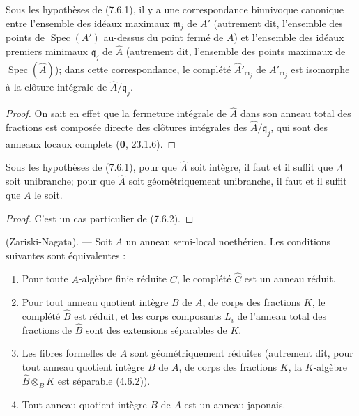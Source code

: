 \begin{corollary}[7.6.2]
\label{IV.2.s7.6.2-fr}
Sous les hypothèses de \textup{(7.6.1)}, il y a une correspondance biunivoque canonique
entre l'ensemble des idéaux maximaux $\mathfrak m_j$ de $A'$ \textup{(autrement dit,
l'ensemble des points de $\operatorname{Spec}(A')$ au-dessus du point fermé de
$A$)} et l'ensemble des idéaux premiers minimaux $\mathfrak q_j$ de
$\widehat A$ \textup{(autrement dit, l'ensemble des points maximaux de
$\operatorname{Spec}(\widehat A)$)}; dans cette correspondance, le complété
$\widehat{A}'_{\mathfrak m_j}$ de $A'_{\mathfrak m_j}$ est isomorphe à la
clôture intégrale de $\widehat A/\mathfrak q_j$.
\end{corollary}

\begin{proof}
On sait en effet que la fermeture intégrale de $\widehat A$ dans son anneau
total des fractions est composée directe des clôtures intégrales des
$\widehat A/\mathfrak q_j$, qui sont des anneaux locaux complets (\textbf{0}, 23.1.6).
\end{proof}

\begin{corollary}[7.6.3]
\label{IV.2.s7.6.3-fr}
Sous les hypothèses de \textup{(7.6.1)}, pour que $\widehat A$ soit intègre, il faut et
il suffit que $A$ soit unibranche; pour que $\widehat A$ soit géométriquement
unibranche, il faut et il suffit que $A$ le soit.
\end{corollary}

\begin{proof}
C'est un cas particulier de (7.6.2).
\end{proof}

\begin{theorem}[7.6.4]
(Zariski-Nagata). --- Soit $A$ un anneau semi-local noethérien. Les conditions
suivantes sont équivalentes :
\begin{enumerate}
\item[\emph{a)}] Pour toute $A$-algèbre finie réduite $C$, le complété
$\widehat C$ est un anneau réduit.
\item[\emph{a$'$)}] Pour tout anneau quotient intègre $B$ de $A$, de corps des
fractions $K$, le complété $\widehat B$ est réduit, et les corps composants
$L_i$ de l'anneau total des fractions de $\widehat B$ sont des extensions
séparables de $K$.
\item[\emph{a$''$)}] Les fibres formelles de $A$ sont géométriquement réduites
\textup{(autrement dit, pour tout anneau quotient intègre $B$ de $A$, de corps des
fractions $K$, la $K$-algèbre $\widehat B\otimes_BK$ est séparable (4.6.2))}.
\item[\emph{b)}] Tout anneau quotient intègre $B$ de $A$ est un anneau
japonais.
\end{enumerate}
\end{theorem}

